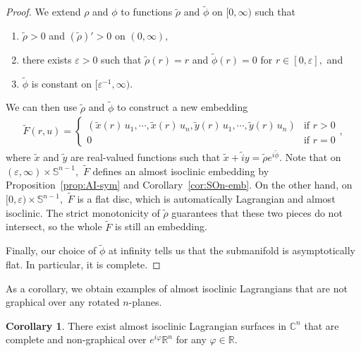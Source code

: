 \documentclass[11pt]{amsart}
\numberwithin{equation}{section}
\theoremstyle{definition}
\theoremstyle{definition}
\newtheorem{cor}[equation]{Corollary}
\newcommand{\pr}[1]{\left(#1\right)}
\newcommand{\bb}[1]{\mathbb{#1}} \newcommand{\td}[1]{\widetilde{#1}}
\begin{document}
\begin{proof}
	We extend $\rho$ and $\phi$ to functions $\td\rho$ and $\td\phi$ on $[0,\infty)$ such that
	\begin{enumerate}
		\item 
		$\td\rho>0$ and $\pr{\td\rho}'>0$ on $(0,\infty),$
		\item 
		there exists $\varepsilon>0$ such that $\td\rho(r)=r$ and $\td\phi(r)=0$ for $r\in[0,\varepsilon],$ and
		\item 
		$\td\phi$ is constant on $[\varepsilon^{-1},\infty).$
	\end{enumerate}
	We can then use $\td\rho$ and $\td\phi$ to construct a new embedding 
	\begin{align*}
	\td F(r,u)
	= \begin{cases}
	\pr{\td x(r)\,u_1,
		\cdots ,
		\td x(r)\,u_n,
		\td y(r)\,u_1,
		\cdots,
		\td y(r)\,u_n}
	&\text{if }r>0\\
	0&\text{if }r=0
	\end{cases},
	\end{align*}
	where $\td x$ and $\td y$ are real-valued functions such that 
	$\td x+\td iy = \td\rho e^{i\td\phi}.$
	Note that on $(\varepsilon,\infty)\times \mathbb S^{n-1},$ $\td F$ defines an almost isoclinic embedding by Proposition~\ref{prop:AI-sym} and Corollary~\ref{cor:SOn-emb}.
	On the other hand, on $[0,\varepsilon)\times \mathbb S^{n-1},$ $\td F$ is a flat disc, which is automatically Lagrangian and almost isoclinic.
	The strict monotonicity of $\td \rho$ guarantees that these two pieces do not intersect, so the whole $\td F$ is still an embedding.
	
	Finally, our choice of $\td\phi$ at infinity tells us that the submanifold is asymptotically flat.
	In particular, it is complete.
\end{proof}


As a corollary, we obtain examples of almost isoclinic Lagrangians that are not graphical over any rotated $n$-planes.

\begin{cor}
	\label{cor:non-graphical-ex}
	There exist almost isoclinic Lagrangian surfaces in $\bb C^n$ that are complete and non-graphical over $e^{i\varphi}\bb R^n$ for any $\varphi\in\bb R.$
\end{cor}
\end{document}
